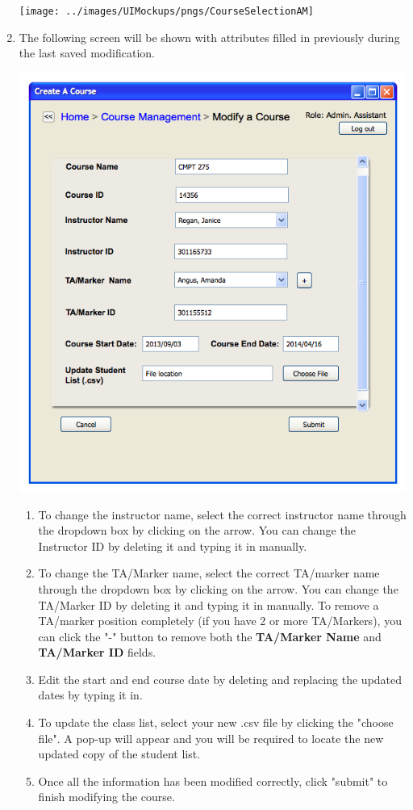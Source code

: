 \documentclass{article}
\begin{document}
\begin{enumerate}
    \begin{center} 
      \texttt{[image: ../images/UIMockups/pngs/CourseSelectionAM]}
    \end{center}

 \item The following screen will be shown with attributes filled in
   previously during the last saved modification. 
   \centerline{\includegraphics[scale=0.55]{../images/UIMockups/pngs/modifyACourse}}
   \begin {enumerate}
   \item To change the instructor name, select the correct instructor name
     through the dropdown box by clicking on the arrow. You can change the
     Instructor ID by deleting it and typing it in manually.
   \item To change the TA/Marker name, select the correct TA/marker name
     through the dropdown box by clicking on the arrow. You can change the
     TA/Marker ID by deleting it and typing it in manually. To remove a
     TA/marker position completely (if you have 2 or more TA/Markers), you can
     click the "-" button to remove both the \textbf{TA/Marker Name} and
     \textbf{TA/Marker ID} fields.
   \item Edit the start and end course date by deleting and replacing the
     updated dates by typing it in.
   \item To update the class list, select your new .csv file by clicking the
     "choose file". A pop-up will appear and you will be required to locate
     the new updated copy of the student list.
   \item Once all the information has been modified correctly, click "submit"
     to finish modifying the course.
   \end{enumerate}
\end{enumerate}
\end{document}

